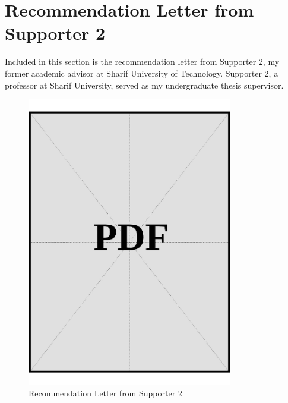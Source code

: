 \clearpage

\section{Recommendation Letter from Supporter 2}\label{sec:recommendation-letter-2}

Included in this section is the recommendation letter from Supporter 2, my former academic advisor at Sharif University of Technology. Supporter 2, a professor at Sharif University, served as my undergraduate thesis supervisor.

\begin{figure}[H]
    \centering
    \includegraphics[page=1, width=0.8\textwidth]{../application-docs/applicant/recommendation-letters/letter-2.pdf}
    \caption{Recommendation Letter from Supporter 2}
    \label{fig:recommendation-letter-2}
\end{figure}

\clearpage
